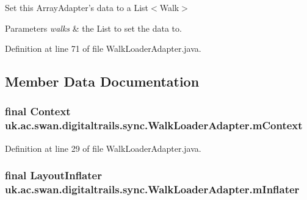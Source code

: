 Set this Array\+Adapter's data to a List$<$\+Walk$>$ 


\begin{DoxyParams}{Parameters}
{\em walks} & the List to set the data to. \\
\hline
\end{DoxyParams}


Definition at line 71 of file Walk\+Loader\+Adapter.\+java.



\subsection{Member Data Documentation}
\hypertarget{classuk_1_1ac_1_1swan_1_1digitaltrails_1_1sync_1_1_walk_loader_adapter_a7c6f05839f481abb7ca31c9f0803d7e0}{
\subsubsection[{m\+Context}]{\setlength{\rightskip}{0pt plus 5cm}final Context uk.\+ac.\+swan.\+digitaltrails.\+sync.\+Walk\+Loader\+Adapter.\+m\+Context\hspace{0.3cm}{\ttfamily [private]}}}\label{classuk_1_1ac_1_1swan_1_1digitaltrails_1_1sync_1_1_walk_loader_adapter_a7c6f05839f481abb7ca31c9f0803d7e0}


Definition at line 29 of file Walk\+Loader\+Adapter.\+java.

\hypertarget{classuk_1_1ac_1_1swan_1_1digitaltrails_1_1sync_1_1_walk_loader_adapter_a0c9b737acae2b1a1f92246d1d3fde68d}{
\subsubsection[{m\+Inflater}]{\setlength{\rightskip}{0pt plus 5cm}final Layout\+Inflater uk.\+ac.\+swan.\+digitaltrails.\+sync.\+Walk\+Loader\+Adapter.\+m\+Inflater\hspace{0.3cm}{\ttfamily [private]}}}\label{classuk_1_1ac_1_1swan_1_1digitaltrails_1_1sync_1_1_walk_loader_adapter_a0c9b737acae2b1a1f92246d1d3fde68d}


